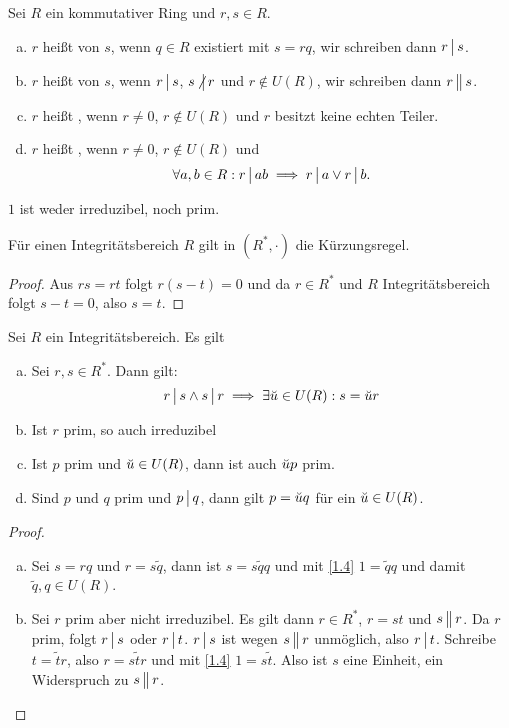 \begin{df} \label{1.3}
	Sei $R$ ein kommutativer Ring und $r, s \in R$.
	\begin{enumerate}[a)]
		\item
			$r$ heißt  von $s$, wenn $q \in R$ existiert mit $s = r q$, wir schreiben dann $r \divs  s$.
		\item
			$r$ heißt  von $s$, wenn $r\divs s$, $s \ndivs  r$ und $r \not\in U(R)$, wir schreiben dann $r \divs*  s$.
		\item
			$r$ heißt , wenn $r \neq 0$, $r \not\in U(R)$ und $r$ besitzt keine echten Teiler.
		\item
			$r$ heißt , wenn $r \neq 0$, $r \not\in U(R)$ und
			\[
				\forall a,b \in R : r \divs  ab \implies r \divs  a \lor r \divs  b.
			\]
	\end{enumerate}
	\begin{note}
		$1$ ist weder irreduzibel, noch prim.
	\end{note}
\end{df}

\begin{lem} \label{1.4}
	Für einen Integritätsbereich $R$ gilt in $(R^*, \cdot)$ die Kürzungsregel.
	\begin{proof}
		Aus $r s = r t$ folgt $r(s-t) = 0$ und da $r \in R^*$ und $R$ Integritätsbereich folgt $s-t = 0$, also $s = t$.
	\end{proof}
\end{lem}

\begin{lem} \label{1.5}
	Sei $R$ ein Integritätsbereich. Es gilt
	\begin{enumerate}[a)]
		\item
			Sei $r, s \in R^*$.
			Dann gilt:
			\[
				r\divs s  \land  s\divs r
				\implies
				\exists \unit u \in U(R) : s = \unit u r
			\]
		\item
			Ist $r$ prim, so auch irreduzibel
		\item
			Ist $p$ prim und $\breve{u} \in U(R)$, dann ist auch $\breve{u} p$ prim.
		\item
			Sind $p$ und $q$ prim und $p \divs  q$, dann gilt $p = \breve{u} q$ für ein $\breve{u} \in U(R)$.
	\end{enumerate}
	\begin{proof}
		\begin{enumerate}[a)]
			\item
				Sei $s = rq$ und $r = s\tilde q$, dann ist $s = s \tilde q q$ und mit \ref{1.4} $1 = \tilde q q$ und damit $\tilde q, q \in U(R)$.
			\item
				Sei $r$ prim aber nicht irreduzibel.
				Es gilt dann $r \in R^*$, $r = st$ und $s \divs*  r$.
				Da $r$ prim, folgt $r \divs  s$ oder $r \divs  t$.
				$r \divs  s$ ist wegen $s \divs*  r$ unmöglich, also $r \divs  t$.
				Schreibe $t = \tilde t r$, also $r = s \tilde t r$ und mit \ref{1.4} $1 = s \tilde t$.
				Also ist $s$ eine Einheit, ein Widerspruch zu $s \divs*  r$.
		\end{enumerate}
	\end{proof}
\end{lem}

